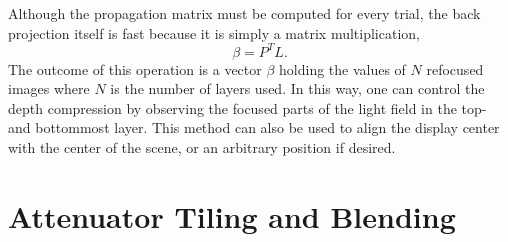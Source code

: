Although the propagation matrix must be computed for every trial, the back projection itself is fast because it is simply a matrix multiplication, 
\begin{equation*}\label{eq:back_projection}
	\beta = P^T L.
\end{equation*}
The outcome of this operation is a vector $\beta$ holding the values of $N$ refocused images where $N$ is the number of layers used.
In this way, one can control the depth compression by observing the focused parts of the light field in the top- and bottommost layer.
This method can also be used to align the display center with the center of the scene, or an arbitrary position if desired.

\section{Attenuator Tiling and Blending}
\label{sec:tiling_and_blending}

